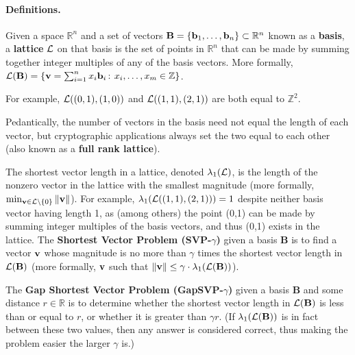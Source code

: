 \paragraph{Definitions.}
\begin{newitemize}
	\item
	Given a space $\mathbb{R}^n$ and a set of vectors $\textbf{B} = 
	\{{{\bf b}}_1,\ldots,{{\bf b}}_n\} \subset \mathbb{R}^n$ known as a \textbf{basis}, 
	a \textbf{lattice} ${\cal L}$ on that basis is the set of points in 
	$\mathbb{R}^n$ that can be made by summing together integer multiples of any 
	of the basis vectors. More formally, ${\cal L}(\textbf{B}) = \{{{\bf v}} = 
	\sum_{i=1}^{n}x_i{{\bf b}}_i {{\kern .05em}\colon{\kern .05em}} x_i,\ldots,x_m \in \mathbb{Z}\}$.
	
	\begin{newitemize}
		\item
		For example, ${\cal L}((0,1),(1,0))$ and ${\cal L}((1,1),(2,1))$ are both 
		equal to $\mathbb{Z}^2$.
		
		\item
		Pedantically, the number of vectors in the basis need not equal the 
		length of each vector, but cryptographic applications always set the two 
		equal to each other (also known as a \textbf{full rank lattice}).
	\end{newitemize}

	\item
	The shortest vector length in a lattice, denoted $\lambda_1({\cal L})$, is the 
	length of the nonzero vector in the lattice with the smallest magnitude 
	(more formally, $\min_{{{\bf v}} \in {\cal L} \setminus \{0\}}{\|{{\bf v}}\|}$). For 
	example, $\lambda_1({\cal L}((1,1),(2,1))) = 1$ despite neither basis vector 
	having length 1, as (among others) the point (0,1) can be made by summing 
	integer multiples of the basis vectors, and thus (0,1) exists in the 
	lattice. The \textbf{Shortest Vector Problem (SVP-$\gamma$)} given a basis 
	$\textbf{B}$ is to find a vector ${{\bf v}}$ whose magnitude is no more than 
	$\gamma$ times the shortest vector length in ${\cal L}(\textbf{B})$ (more 
	formally, ${{\bf v}}$ such that $\|{{\bf v}}\| \le \gamma \cdot 
	\lambda_1({\cal L}(\textbf{B}))$).
	
	\item
	The \textbf{Gap Shortest Vector Problem (GapSVP-$\gamma$)} given a basis 
	$\textbf{B}$ and some distance $r \in \mathbb{R}$ is to determine whether 
	the shortest vector length in ${\cal L}(\textbf{B})$ is less than or equal to 
	$r$, or whether it is greater than $\gamma r$. (If 
	$\lambda_1({\cal L}(\textbf{B}))$ is in fact between these two values, then any 
	answer is considered correct, thus making the problem easier the larger 
	$\gamma$ is.)
\end{newitemize}

